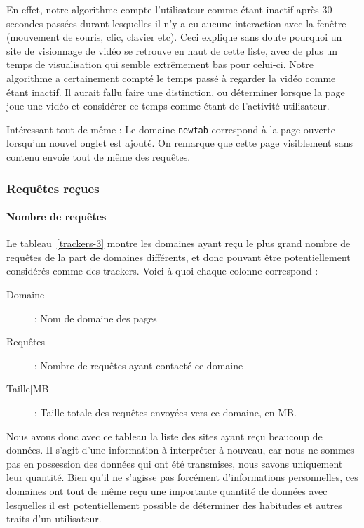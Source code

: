 			En effet, notre algorithme compte l'utilisateur comme étant inactif après 30 secondes passées durant lesquelles il n'y a eu aucune interaction avec la fenêtre (mouvement de souris, clic, clavier etc). Ceci explique sans doute pourquoi un site de visionnage de vidéo se retrouve en haut de cette liste, avec de plus un temps de visualisation qui semble extrêmement bas pour celui-ci. Notre algorithme a certainement compté le temps passé à regarder la vidéo comme étant inactif. Il aurait fallu faire une distinction, ou déterminer lorsque la page joue une vidéo et considérer ce temps comme étant de l'activité utilisateur.

			Intéressant tout de même : Le domaine \texttt{newtab} correspond à la page ouverte lorsqu'un nouvel onglet est ajouté. On remarque que cette page visiblement sans contenu envoie tout de même des requêtes.

		\newpage

		\FloatBarrier

		\subsubsection{Requêtes reçues}

			\paragraph{Nombre de requêtes} Le tableau~\ref{trackers-3} montre les domaines ayant reçu le plus grand nombre de requêtes de la part de domaines différents, et donc pouvant être potentiellement considérés comme des trackers. Voici à quoi chaque colonne correspond :
			\begin{description}
				\item[Domaine] : Nom de domaine des pages
				\item[Requêtes] : Nombre de requêtes ayant contacté ce domaine
				\item[Taille{[}MB{]}] : Taille totale des requêtes envoyées vers ce domaine, en MB.
			\end{description}

			Nous avons donc avec ce tableau la liste des sites ayant reçu beaucoup de données. Il s'agit d'une information à interpréter à nouveau, car nous ne sommes pas en possession des données qui ont été transmises, nous savons uniquement leur quantité. Bien qu'il ne s'agisse pas forcément d'informations personnelles, ces domaines ont tout de même reçu une importante quantité de données avec lesquelles il est potentiellement possible de déterminer des habitudes et autres traits d'un utilisateur.

